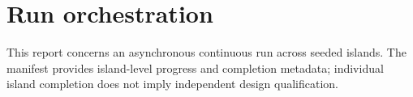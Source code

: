 \section{Run orchestration}This report concerns an asynchronous continuous run across seeded islands. The manifest provides island-level progress and completion metadata; individual island completion does not imply independent design qualification.
